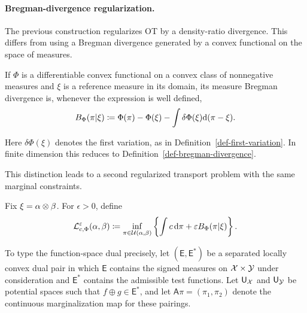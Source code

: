 \paragraph{Bregman-divergence regularization.}

The previous construction regularizes OT by a density-ratio divergence. This differs from using a Bregman divergence generated by a convex functional on the space of measures.

\begin{defn}\label{def-measure-bregman-divergence}
	If $\Phi$ is a differentiable convex functional on a convex class of nonnegative measures and $\xi$ is a reference measure in its domain, its measure Bregman divergence is, whenever the expression is well defined,
	\begin{equation}\label{eq-measure-bregman-divergence}
		B_\Phi(\pi|\xi)
		\coloneqq
		\Phi(\pi)-\Phi(\xi)
		-
		\int \delta\Phi(\xi)\mathrm{d}(\pi-\xi).
	\end{equation}
\end{defn}
Here $\delta\Phi(\xi)$ denotes the first variation, as in Definition~\ref{def-first-variation}. In finite dimension this reduces to Definition~\ref{def-bregman-divergence}.

This distinction leads to a second regularized transport problem with the same marginal constraints.
\begin{defn}\label{def-bregman-regularized-ot}
Fix $\xi=\alpha\otimes\beta$. For $\epsilon>0$, define
\[
	\mathcal{L}_{c,\Phi}^{\varepsilon}(\alpha,\beta)
	\coloneqq
	\inf_{\pi\in\mathcal{U}(\alpha,\beta)}
	\left\{\int c\,\mathrm{d}\pi+\varepsilon B_\Phi(\pi|\xi)\right\}.
\]
\end{defn}

To type the function-space dual precisely, let $(\mathsf E,\mathsf E^*)$ be a separated locally convex dual pair in which $\mathsf E$ contains the signed measures on $\mathcal{X}\times\mathcal{Y}$ under consideration and $\mathsf E^*$ contains the admissible test functions. Let $\mathsf U_{\mathcal{X}}$ and $\mathsf U_{\mathcal{Y}}$ be potential spaces such that $f\oplus g\in\mathsf E^*$, and let $\mathsf A\pi=(\pi_1,\pi_2)$ denote the continuous marginalization map for these pairings.

